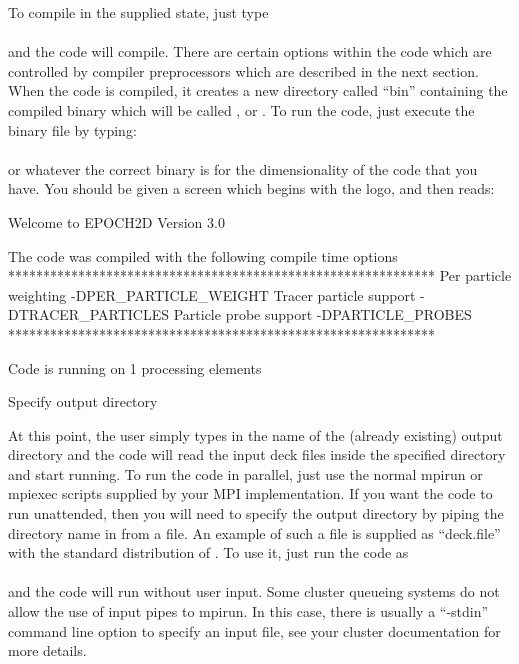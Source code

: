 To compile {\EPOCH} in the supplied state, just type\\
\indent{}\\
and the code will compile. There are certain options within the code which are
controlled by compiler preprocessors which are described in the next
section. When the code is compiled, it creates a new directory called ``bin''
containing the compiled binary which will be called ,
 or . To run the code, just execute the
binary file by typing:\\
\indent{}\\
or whatever the correct binary is for the dimensionality of the code that you
have. You should be given a screen which begins with the {\EPOCH} logo, and then
reads:
\begin{boxverbatim}
 Welcome to EPOCH2D Version 3.0

 The code was compiled with the following compile time options
 *************************************************************
 Per particle weighting -DPER_PARTICLE_WEIGHT
 Tracer particle support -DTRACER_PARTICLES
 Particle probe support -DPARTICLE_PROBES
 *************************************************************

 Code is running on 1 processing elements


 Specify output directory
\end{boxverbatim}

At this point, the user simply types in the name of the (already existing)
output directory and the code will read the input deck files inside the
specified directory and start running. To run the code in parallel, just use
the normal mpirun or mpiexec scripts supplied by your MPI implementation. If
you want the code to run unattended, then you will need to specify the output
directory by piping the directory name in from a file. An example of such a
file is supplied as ``deck.file'' with the standard distribution of {\EPOCH}. To
use it, just run the code as\\
\indent{}\\
and the code will run without user input. Some cluster queueing systems do not
allow the use of input pipes to mpirun. In this case, there is usually a
``-stdin'' command line option to specify an input file, see your cluster
documentation for more details.

